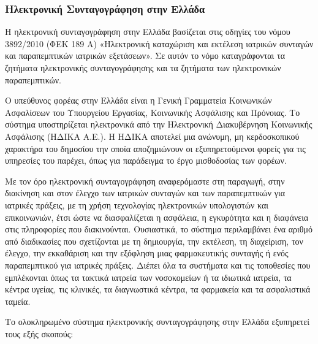 		
		
		\subsubsection{Ηλεκτρονική Συνταγογράφηση στην Ελλάδα}
		
		Η ηλεκτρονική συνταγογράφηση στην Ελλάδα βασίζεται στις οδηγίες του νόμου 3892/2010 (ΦΕΚ 189 Α) «Ηλεκτρονική καταχώριση και εκτέλεση ιατρικών συνταγών και παραπεμπτικών ιατρικών εξετάσεων». Σε αυτόν το νόμο καταγράφονται τα ζητήματα ηλεκτρονικής συνταγογράφησης και τα ζητήματα των ηλεκτρονικών παραπεμπτικών.
		
		Ο υπεύθυνος φορέας στην Ελλάδα είναι η Γενική Γραμματεία Κοινωνικών Ασφαλίσεων του Υπουργείου Εργασίας, Κοινωνικής Ασφάλισης και Πρόνοιας. Το σύστημα υποστηρίζεται ηλεκτρονικά από την Ηλεκτρονική Διακυβέρνηση Κοινωνικής Ασφάλισης (ΗΔΙΚΑ Α.Ε.). Η ΗΔΙΚΑ αποτελεί μια ανώνυμη, μη κερδοσκοπικού χαρακτήρα του δημοσίου την οποία αποζημιώνουν οι εξυπηρετούμενοι φορείς για τις υπηρεσίες του παρέχει, όπως για παράδειγμα το έργο μισθοδοσίας των φορέων.  \cite{idika}
		
		Με τον όρο ηλεκτρονική συνταγογράφηση αναφερόμαστε στη παραγωγή, στην διακίνηση και στον έλεγχο των ιατρικών συνταγών και των παραπεμπτικών για ιατρικές πράξεις, με τη χρήση τεχνολογίας ηλεκτρονικών υπολογιστών και επικοινωνιών, έτσι ώστε να διασφαλίζεται η ασφάλεια, η εγκυρότητα και η διαφάνεια στις πληροφορίες που διακινούνται. Ουσιαστικά, το σύστημα περιλαμβάνει ένα αριθμό από διαδικασίες που σχετίζονται με τη δημιουργία, την εκτέλεση, τη διαχείριση, τον έλεγχο, την εκκαθάριση και την εξόφληση μιας φαρμακευτικής συνταγής ή ενός παραπεμπτικού για ιατρικές πράξεις. Διέπει όλα τα συστήματα και τις τοποθεσίες που εμπλέκονται όπως τα τακτικά ιατρεία των νοσοκομείων ή τα ιδιωτικά ιατρεία, τα κέντρα υγείας, τις κλινικές, τα διαγνωστικά κέντρα, τα φαρμακεία και τα ασφαλιστικά ταμεία.


		
		Το ολοκληρωμένο σύστημα ηλεκτρονικής συνταγογράφησης στην Ελλάδα εξυπηρετεί τους εξής σκοπούς:
		
